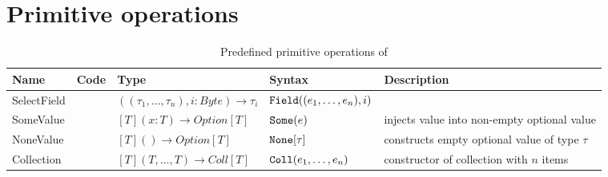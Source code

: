\section{Primitive operations}
\label{sec:appendix:primops}

\begin{table}[h]
    \tiny
    \begin{tabu}{|l |l |l |l |l |}
	\hline
	\rowfont{\bfseries}
Name &   Code   &  Type  & Syntax & Description \\
	\hline
SelectField		&	& $((\tau_1,\dots,\tau_n), i: Byte) \to \tau_i$	&	$\SelectField{(e_1,\dots,e_n)}{i}$	&  \\
	\hline
SomeValue		&	& $[T](x: T) \to Option[T]$	& $\Some{e}$ 	& injects value into non-empty optional value \\
	\hline
NoneValue		&	& $[T]()\to Option[T]$		& $\None{\tau}$	& constructs empty optional value of type $\tau$ \\
	\hline
Collection	&	& $[T](T, \dots, T)\to Coll[T]$	& $\Coll{e_1,\dots,e_n}$ & constructor of collection with $n$ items \\
    \hline
    \end{tabu}
    \caption{Predefined primitive operations of \langname}
    \label{table:primops}
\end{table}

